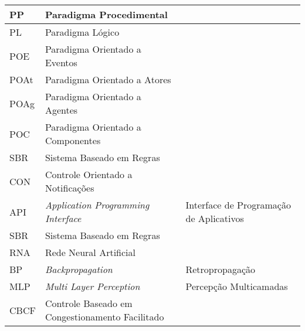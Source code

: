\begin{table}[h!]
\begin{tabularx}{\textwidth}{l|X|X}
PP      & Paradigma Procedimental                                                   &                                                    \\ \hline
PL      & Paradigma Lógico                                                          &                                                    \\ \hline
POE     & Paradigma Orientado a Eventos                                             &                                                    \\ \hline
POAt    & Paradigma Orientado a Atores                                              &                                                    \\ \hline
POAg    & Paradigma Orientado a Agentes                                             &                                                    \\ \hline
POC     & Paradigma Orientado a Componentes                                         &                                                    \\ \hline
SBR     & Sistema Baseado em Regras                                                 &                                                    \\ \hline
CON     & Controle Orientado a Notificações                                         &                                                    \\ \hline
API     & \textit{Application Programming Interface}                                & Interface de Programação de Aplicativos            \\ \hline
SBR     & Sistema Baseado em Regras                                                 &                                                    \\ \hline
RNA     & Rede Neural Artificial                                                    &                                                    \\ \hline
BP      & \textit{Backpropagation}                                                  & Retropropagação                                    \\ \hline
MLP     & \textit{Multi Layer Perception}                                           & Percepção Multicamadas                             \\ \hline
CBCF    & Controle Baseado em Congestionamento Facilitado                           &                                                   
\end{tabularx}
\end{table}
\cleardoublepage


